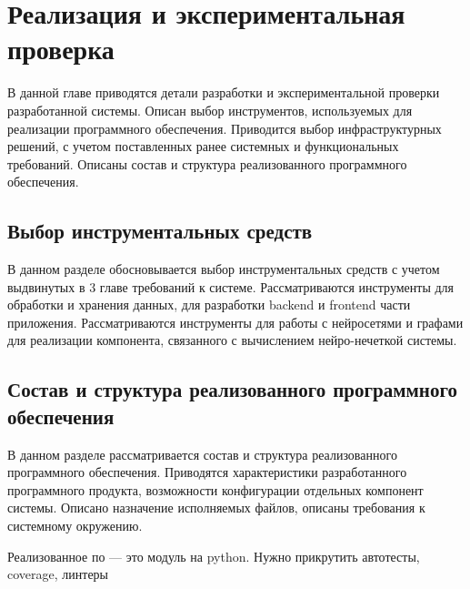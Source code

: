 \chapter{Реализация и экспериментальная проверка}

\begin{annotation}
	В данной главе приводятся детали разработки и экспериментальной проверки
	разработанной системы. Описан выбор инструментов, используемых для реализации
	программного обеспечения. Приводится выбор инфраструктурных решений,
	с учетом поставленных ранее системных и функциональных требований.
	Описаны состав и структура реализованного программного обеспечения.
\end{annotation}




\section{Выбор инструментальных средств}
\begin{annotation}
	В данном разделе обосновывается выбор инструментальных средств с учетом выдвинутых в 3
	главе требований к системе. Рассматриваются инструменты для обработки и хранения данных,
	для разработки backend и frontend части приложения. Рассматриваются инструменты для работы
	с нейросетями и графами для реализации компонента, связанного с вычислением нейро-нечеткой системы.
\end{annotation}



\section{Состав и структура реализованного программного обеспечения}
\begin{annotation}
	В данном разделе рассматривается состав и структура реализованного программного обеспечения.
	Приводятся характеристики разработанного программного продукта, возможности конфигурации отдельных
	компонент системы. Описано назначение исполняемых файлов, описаны требования к системному окружению.
\end{annotation}

Реализованное по --- это модуль на python.
Нужно прикрутить автотесты, coverage, линтеры

